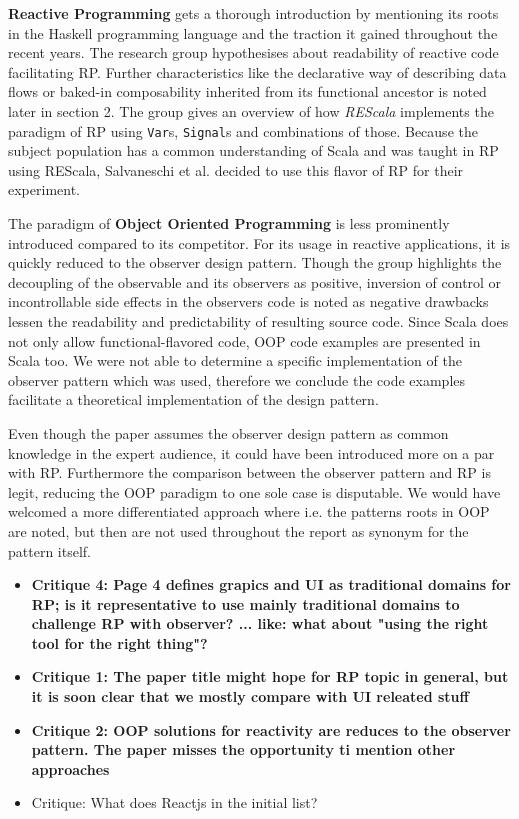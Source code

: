 \documentclass[12pt,a4paper]{article}
\begin{document}
\textbf{Reactive Programming} gets a thorough introduction by mentioning its roots in the Haskell programming language and the traction it gained throughout the recent years. The research group hypothesises about readability of reactive code facilitating RP. Further characteristics like the declarative way of describing data flows or baked-in composability inherited from its functional ancestor is noted later in section 2. The group gives an overview of how \emph{REScala} implements the paradigm of RP using \texttt{Var}s, \texttt{Signal}s and combinations of those. Because the subject population has a common understanding of Scala and was taught in RP using REScala, Salvaneschi et al. decided to use this flavor of RP for their experiment.

The paradigm of \textbf{Object Oriented Programming} is less prominently introduced compared to its competitor. For its usage in reactive applications, it is quickly reduced to the observer design pattern. Though the group highlights the decoupling of the observable and its observers as positive, inversion of control or incontrollable side effects in the observers code is noted as negative drawbacks lessen the readability and predictability of resulting source code. Since Scala does not only allow functional-flavored code, OOP code examples are presented in Scala too. We were not able to determine a specific implementation of the observer pattern which was used, therefore we conclude the code examples facilitate a theoretical implementation of the design pattern.

Even though the paper assumes the observer design pattern as common knowledge in the expert audience, it could have been introduced more on a par with RP. Furthermore the comparison between the observer pattern and RP is legit, reducing the OOP paradigm to one sole case is disputable. We would have welcomed a more differentiated approach where i.e. the patterns roots in OOP are noted, but then are not used throughout the report as synonym for the pattern itself.





\begin{itemize}
	\item \textbf{Critique 4: Page 4 defines grapics and UI as traditional domains for RP; is it representative to use mainly traditional domains to challenge RP with observer? ... like: what about "using the right tool for the right thing"?}
	\item \textbf{Critique 1: The paper title might hope for RP topic in general, but it is soon clear that we mostly compare with UI releated stuff}
	\item \textbf{Critique 2: OOP solutions for reactivity are reduces to the observer pattern. The paper misses the opportunity ti mention other approaches}
	\item Critique: What does Reactjs in the initial list?
\end{itemize}
\end{document}
